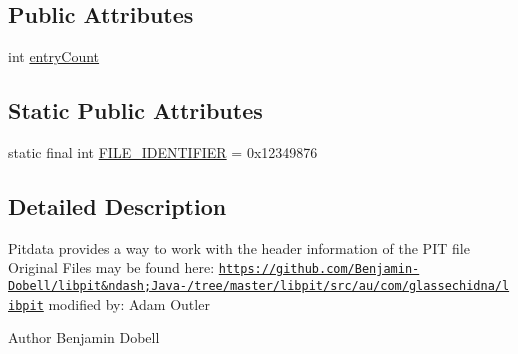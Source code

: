 \subsection*{Public Attributes}
\begin{DoxyCompactItemize}
\item 
int \hyperlink{classcom_1_1casual__dev_1_1libpit_x_1_1_pit_data_a675514f1324f841f0385dc972dad5d87}{entry\-Count}
\end{DoxyCompactItemize}
\subsection*{Static Public Attributes}
\begin{DoxyCompactItemize}
\item 
static final int \hyperlink{classcom_1_1casual__dev_1_1libpit_x_1_1_pit_data_aac62ade2b33051f8fcbf59e2b7117fb5}{F\-I\-L\-E\-\_\-\-I\-D\-E\-N\-T\-I\-F\-I\-E\-R} = 0x12349876
\end{DoxyCompactItemize}


\subsection{Detailed Description}
Pitdata provides a way to work with the header information of the P\-I\-T file Original Files may be found here\-: \href{https://github.com/Benjamin-Dobell/libpit&ndash;Java-/tree/master/libpit/src/au/com/glassechidna/libpit}{\tt https\-://github.\-com/\-Benjamin-\/\-Dobell/libpit\&ndash;\-Java-\//tree/master/libpit/src/au/com/glassechidna/libpit} modified by\-: Adam Outler

\begin{DoxyAuthor}{Author}
Benjamin Dobell 
\end{DoxyAuthor}


